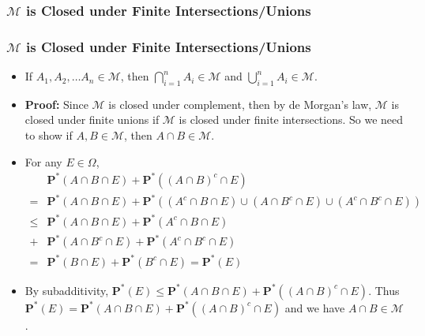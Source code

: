 \documentclass[handout]{beamer}
\newcommand{\BP}{\mathbf{P}}
\begin{document}
\subsubsection{$\mathcal{M}$ is Closed under Finite Intersections/Unions}
\frame
{
  \frametitle{$\mathcal{M}$ is Closed under Finite Intersections/Unions}

   \begin{itemize}

            \item<1->   [] \begin{Lemma}[2.3.10] If $A_1, A_2,\ldots A_n \in \mathcal{M}$, then $\bigcap_{i=1}^n A_i \in \mathcal{M}$ and  $\bigcup_{i=1}^n A_i \in \mathcal{M}$.                \end{Lemma}    
       
              \item<2-> []\textbf{Proof:} Since $\mathcal{M}$ is closed under complement, then by de Morgan's law, $\mathcal{M}$ is closed under finite unions if $\mathcal{M}$ is closed under finite intersections. So we need to show if $A, B\in \mathcal{M}$, then $A\cap B\in \mathcal{M}$.
                         
             \item<3-> [1)]  For any $E\in \Omega$, 
             \begin{align*}& \BP^*(A\cap B \cap E)+\BP^*( (A\cap B)^c \cap E) \\ = & \BP^*(A\cap B \cap E)+\BP^*( (A^c\cap B \cap E) \cup (A\cap B^c \cap E) \cup (A^c\cap B^c \cap E) )  \\ \leq & \BP^*(A\cap B \cap E)+\BP^*( A^c\cap B \cap E) \\ + & \BP^*(A\cap B^c \cap E) +\BP^*( A^c\cap B^c \cap E) \\= & \BP^*(B \cap E)+\BP^*( B^c \cap E)=\BP^*(E)
             \end{align*}
                 
              \item<4-> [2)]  By subadditivity, $\BP^*(E) \leq \BP^*(A\cap B \cap E)+\BP^*( (A\cap B)^c \cap E)$. Thus $\BP^*(E)=\BP^*(A\cap B \cap E)+\BP^*( (A\cap B)^c \cap E)$ and we have $A\cap B\in \mathcal{M}$.
             
             
                 \end{itemize}
}
\end{document}
